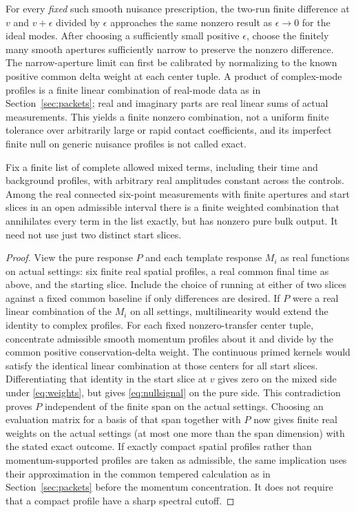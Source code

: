 For every \emph{fixed} such smooth nuisance prescription, the two-run finite difference at \(v\) and \(v+\epsilon\) divided by \(\epsilon\) approaches the same nonzero result as \(\epsilon\to0\) for the ideal modes. After choosing a sufficiently small positive \(\epsilon\), choose the finitely many smooth apertures sufficiently narrow to preserve the nonzero difference. The narrow-aperture limit can first be calibrated by normalizing to the known positive common delta weight at each center tuple. A product of complex-mode profiles is a finite linear combination of real-mode data as in Section~\ref{sec:packets}; real and imaginary parts are real linear sums of actual measurements. This yields a finite nonzero combination, not a uniform finite tolerance over arbitrarily large or rapid contact coefficients, and its imperfect finite null on generic nuisance profiles is not called exact.

\begin{theorem}\label{thm:actualnull}
Fix a finite list of complete allowed mixed terms, including their time and background profiles, with arbitrary real amplitudes constant across the controls. Among the real connected six-point measurements with finite apertures and start slices in an open admissible interval there is a finite weighted combination that annihilates every term in the list exactly, but has nonzero pure bulk output. It need not use just two distinct start slices.
\end{theorem}
\begin{proof}
View the pure response \(P\) and each template response \(M_i\) as real functions on actual settings: six finite real spatial profiles, a real common final time as above, and the starting slice. Include the choice of running at either of two slices against a fixed common baseline if only differences are desired. If \(P\) were a real linear combination of the \(M_i\) on all settings, multilinearity would extend the identity to complex profiles. For each fixed nonzero-transfer center tuple, concentrate admissible smooth momentum profiles about it and divide by the common positive conservation-delta weight. The continuous primed kernels would satisfy the identical linear combination at those centers for all start slices. Differentiating that identity in the start slice at \(v\) gives zero on the mixed side under \eqref{eq:weights}, but gives \eqref{eq:nullsignal} on the pure side. This contradiction proves \(P\) independent of the finite span on the actual settings. Choosing an evaluation matrix for a basis of that span together with \(P\) now gives finite real weights on the actual settings (at most one more than the span dimension) with the stated exact outcome. If exactly compact spatial profiles rather than momentum-supported profiles are taken as admissible, the same implication uses their approximation in the common tempered calculation as in Section~\ref{sec:packets} before the momentum concentration. It does not require that a compact profile have a sharp spectral cutoff.
\end{proof}

